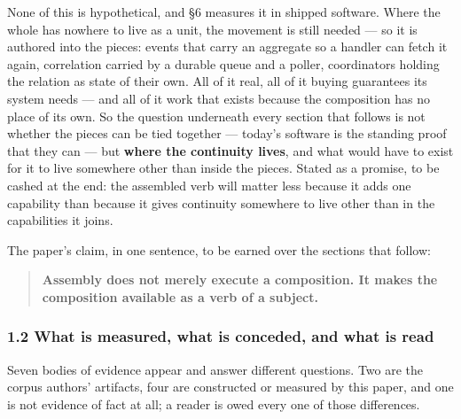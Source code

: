 \documentclass[
]{article}
\begin{document}
None of this is hypothetical, and §6 measures it in shipped software.
Where the whole has nowhere to live as a unit, the movement is still
needed --- so it is authored into the pieces: events that carry an
aggregate so a handler can fetch it again, correlation carried by a
durable queue and a poller, coordinators holding the relation as state
of their own. All of it real, all of it buying guarantees its system
needs --- and all of it work that exists because the composition has no
place of its own. So the question underneath every section that follows
is not whether the pieces can be tied together --- today's software is
the standing proof that they can --- but \textbf{where the continuity
lives}, and what would have to exist for it to live somewhere other than
inside the pieces. Stated as a promise, to be cashed at the end: the
assembled verb will matter less because it adds one capability than
because it gives continuity somewhere to live other than in the
capabilities it joins.

The paper's claim, in one sentence, to be earned over the sections that
follow:

\begin{quote}
\textbf{Assembly does not merely execute a composition. It makes the
composition available as a verb of a subject.}
\end{quote}

\subsubsection{1.2 What is measured, what is conceded, and what is
read}\label{what-is-measured-what-is-conceded-and-what-is-read}

Seven bodies of evidence appear and answer different questions. Two are
the corpus authors' artifacts, four are constructed or measured by this
paper, and one is not evidence of fact at all; a reader is owed every
one of those differences.
\end{document}
